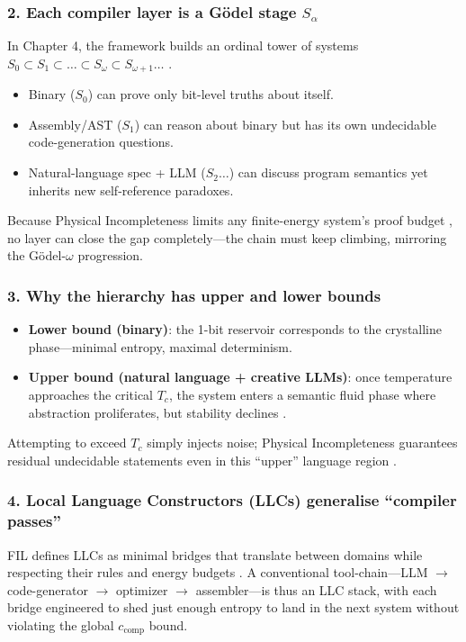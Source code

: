 \documentclass[11pt,letterpaper]{article}
\begin{document}
\subsubsection*{2. Each compiler layer is a Gödel stage $S_\alpha$}
In Chapter 4, the framework builds an ordinal tower of systems $S_0 \subset S_1 \subset \dots \subset S_\omega \subset S_{\omega+1} \dots$ \cite[§L37-L43]{file0}.
\begin{itemize}
    \item Binary ($S_0$) can prove only bit-level truths about itself.
    \item Assembly/AST ($S_1$) can reason about binary but has its own undecidable code-generation questions.
    \item Natural-language spec + LLM ($S_2 \dots$) can discuss program semantics yet inherits new self-reference paradoxes.
\end{itemize}
Because Physical Incompleteness limits any finite-energy system’s proof budget \cite[§L17-L28]{file0}, no layer can close the gap completely—the chain must keep climbing, mirroring the Gödel-$\omega$ progression.

\subsubsection*{3. Why the hierarchy has upper and lower bounds}
\begin{itemize}
    \item \textbf{Lower bound (binary)}: the 1-bit reservoir corresponds to the crystalline phase—minimal entropy, maximal determinism.
    \item \textbf{Upper bound (natural language + creative LLMs)}: once temperature approaches the critical $T_c$, the system enters a semantic fluid phase where abstraction proliferates, but stability declines \cite[§L27-L36]{file3}.
\end{itemize}
Attempting to exceed $T_c$ simply injects noise; Physical Incompleteness guarantees residual undecidable statements even in this “upper” language region \cite[§L51-L57]{file6}.

\subsubsection*{4. Local Language Constructors (LLCs) generalise “compiler passes”}
FIL defines LLCs as minimal bridges that translate between domains while respecting their rules and energy budgets \cite[§L24-L33]{file12}. A conventional tool-chain—LLM $\to$ code-generator $\to$ optimizer $\to$ assembler—is thus an LLC stack, with each bridge engineered to shed just enough entropy to land in the next system without violating the global $c_{\text{comp}}$ bound.
\end{document}
